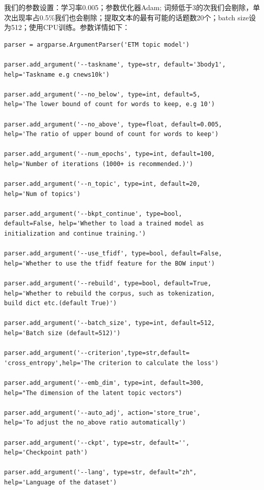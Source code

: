 \documentclass[twocolumn]{article}
\begin{document}
    我们的参数设置：学习率0.005；参数优化器Adam; 词频低于3的次我们会剔除，单次出现率占0.5\%我们也会剔除；提取文本的最有可能的话题数20个；batch size设为512；使用CPU训练。参数详情如下：
\begin{verbatim}
parser = argparse.ArgumentParser('ETM topic model')

parser.add_argument('--taskname', type=str, default='3body1',
help='Taskname e.g cnews10k')

parser.add_argument('--no_below', type=int, default=5,
help='The lower bound of count for words to keep, e.g 10')

parser.add_argument('--no_above', type=float, default=0.005,
help='The ratio of upper bound of count for words to keep')

parser.add_argument('--num_epochs', type=int, default=100,
help='Number of iterations (1000+ is recommended.)')

parser.add_argument('--n_topic', type=int, default=20,
help='Num of topics')

parser.add_argument('--bkpt_continue', type=bool, 
default=False, help='Whether to load a trained model as
initialization and continue training.')

parser.add_argument('--use_tfidf', type=bool, default=False,
help='Whether to use the tfidf feature for the BOW input')

parser.add_argument('--rebuild', type=bool, default=True,
help='Whether to rebuild the corpus, such as tokenization, 
build dict etc.(default True)')

parser.add_argument('--batch_size', type=int, default=512,
help='Batch size (default=512)')

parser.add_argument('--criterion',type=str,default=
'cross_entropy',help='The criterion to calculate the loss')

parser.add_argument('--emb_dim', type=int, default=300,
help="The dimension of the latent topic vectors")

parser.add_argument('--auto_adj', action='store_true',
help='To adjust the no_above ratio automatically')

parser.add_argument('--ckpt', type=str, default='',
help='Checkpoint path')

parser.add_argument('--lang', type=str, default="zh",
help='Language of the dataset')
\end{verbatim}
\end{document}
